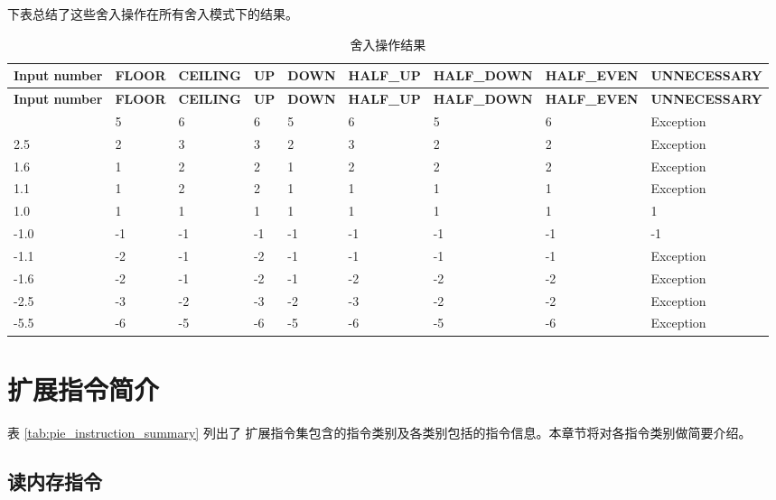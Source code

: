 \documentclass[main\_\_CN.tex]{subfiles}
\begin{document}
    下表总结了这些舍入操作在所有舍入模式下的结果。


\begin{longtable}[c]{|l|l|l|l|l|l|l|l|l|}
    \caption{舍入操作结果}
    \label{tab:ESP-rounding-mode-results}\\
    \hline
    \rowcolor{lightgray}
    \textbf{Input number} & \textbf{FLOOR} & \textbf{CEILING} & \textbf{UP} & \textbf{DOWN}  & \textbf{HALF\_UP} & \textbf{HALF\_DOWN} & \textbf{HALF\_EVEN} & \textbf{UNNECESSARY}\\\hline
    \endfirsthead
    \rowcolor{lightgray}
        \textbf{Input number} & \textbf{FLOOR} & \textbf{CEILING} & \textbf{UP} & \textbf{DOWN}  & \textbf{HALF\_UP} & \textbf{HALF\_DOWN} & \textbf{HALF\_EVEN} & \textbf{UNNECESSARY} \\\hline
    \endhead
    \endfoot
    5.5 & 5 & 6& 6 &5 & 6 & 5 & 6 & Exception \\\hline
    2.5 & 2 & 3& 3& 2& 3& 2& 2& Exception \\\hline
    1.6 & 1 & 2& 2& 1& 2& 2& 2& Exception \\\hline
    1.1 & 1 & 2& 2& 1& 1& 1& 1& Exception \\\hline
    1.0 & 1 & 1& 1& 1& 1& 1& 1& 1 \\\hline
    -1.0 & -1 & -1 & -1 & -1 & -1 & -1 & -1 & -1 \\\hline
    -1.1 & -2 & -1 & -2 & -1 & -1 & -1 & -1 & Exception \\\hline
    -1.6 & -2 & -1 &-2 & -1 & -2 & -2& -2& Exception \\\hline
    -2.5 & -3 & -2 & -3 & -2 & -3 & -2 & -2 & Exception \\\hline
    -5.5 & -6 & -5 & -6 & -5 & -6 & -5 & -6 & Exception \\\hline
\end{longtable}

\section{扩展指令简介}\label{sec:pie-instruction-simple-introduction}

表 \ref{tab:pie_instruction_summary} 列出了 \chipname{} 扩展指令集包含的指令类别及各类别包括的指令信息。本章节将对各指令类别做简要介绍。


\newpage


\subsection{读内存指令}
\label{sec:pie-load-instructions}
\end{document}
